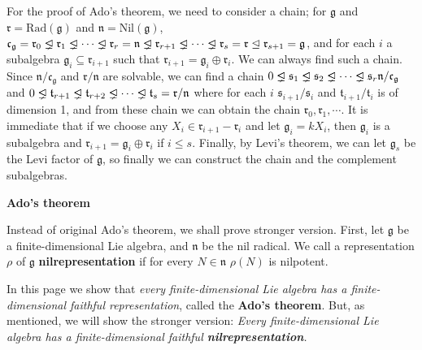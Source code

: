 \documentclass{article}
\newcommand{\lie}[1]{\mathfrak{#1}}
\newcommand{\Rad}[1]{\mathrm{Rad}(#1)}
\newcommand{\Nil}[1]{\mathrm{Nil}(#1)}
\newcommand{\triangleleftneq}{%
  \mathrel{\ooalign{$\lneq$\cr\raise.22ex\hbox{$\lhd$}\cr}}}
\begin{document}
For the proof of Ado's theorem, we need to consider a chain; for $\lie{g}$ and $\lie{r} = \Rad{\lie{g}}$ and $\lie{n} = \Nil{\lie{g}}$, $\lie{c}_\lie{g} = \lie{r}_0 \triangleleftneq \lie{r}_1 \triangleleftneq \cdots \triangleleftneq \lie{r}_r = \lie{n} \triangleleftneq \lie{r}_{r + 1} \triangleleftneq \cdots \triangleleftneq \lie{r}_s = \lie{r} \trianglelefteq \lie{r}_{s + 1} = \lie{g}$, and for each $i$ a subalgebra $\lie{g}_i \subseteq \lie{r}_{i + 1}$ such that $\lie{r}_{i + 1} = \lie{g}_i \oplus \lie{r}_i$.
We can always find such a chain.
Since $\lie{n} / \lie{c}_\lie{g}$ and $\lie{r} / \lie{n}$ are solvable, we can find a chain $0 \triangleleftneq \lie{s}_1 \triangleleftneq \lie{s}_2 \triangleleftneq \cdots \triangleleftneq \lie{s}_r \lie{n} / \lie{c}_\lie{g}$ and $0 \triangleleftneq \lie{t}_{r + 1} \triangleleftneq \lie{t}_{r + 2} \triangleleftneq \cdots \triangleleftneq \lie{t}_s = \lie{r} / \lie{n}$ where for each $i$ $\lie{s}_{i + 1} / \lie{s}_i$ and $\lie{t}_{i + 1} / \lie{t}_i$ is of dimension 1, and from these chain we can obtain the chain $\lie{r}_0, \lie{r}_1, \cdots$.
It is immediate that if we choose any $X_i \in \lie{r}_{i + 1} - \lie{r}_i$ and let $\lie{g}_i = kX_i$, then $\lie{g}_i$ is a subalgebra and $\lie{r}_{i + 1} = \lie{g}_i \oplus \lie{r}_i$ if $i \le s$.
Finally, by Levi's theorem, we can let $\lie{g}_s$ be the Levi factor of $\lie{g}$, so finally we can construct the chain and the complement subalgebras.

\newpage

\textbf{Ado's theorem}

Instead of original Ado's theorem, we shall prove stronger version.
First, let $\lie{g}$ be a finite-dimensional Lie algebra, and $\lie{n}$ be the nil radical.
We call a representation $\rho$ of $\lie{g}$ \textbf{nilrepresentation} if for every $N \in \lie{n}$ $\rho(N)$ is nilpotent.

In this page we show that \textit{every finite-dimensional Lie algebra has a finite-dimensional faithful representation}, called the \textbf{Ado's theorem}.
But, as mentioned, we will show the stronger version: \textit{Every finite-dimensional Lie algebra has a finite-dimensional faithful \textbf{nilrepresentation}.}
\end{document}
